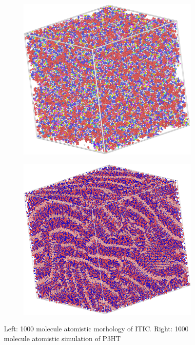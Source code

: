 \begin{figure}[]
\centering
\begin{subfigure}{.5\textwidth}
    \includegraphics[width=\textwidth]{figures/ITIC.png}
\end{subfigure}%
\begin{subfigure}{.5\textwidth}
    \includegraphics[width=\textwidth]{figures/P3HT.png}
\end{subfigure}
    \caption[short]{Left: 1000 molecule atomistic morhology of ITIC. Right: 1000 molecule atomistic simulation
    of P3HT}
\label{ITIC/P3HT}
\end{figure}


